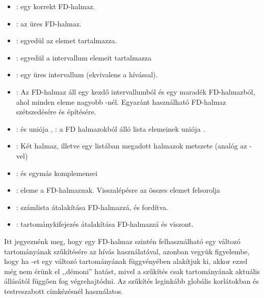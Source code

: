 \begin{itemize}
\item {}:  egy korrekt FD-halmaz.
\item {}:  az üres FD-halmaz.
\item {}:  egyedül az  elemet tartalmazza.
\item {}:  egyedül a 
intervallum elemeit tartalmazza
\item {}:  egy üres intervallum
(ekvivalens a  hívással).
\item {}: Az  FD-halmaz áll egy
 kezdő intervallumból és egy  maradék FD-halmazból, ahol
 minden eleme nagyobb -nél. Egyaránt használható
FD-halmaz szétszedésére és építésére.
\item {}:  és 
uniója ,
: a  FD halmazokból
álló lista elemeinek uniója .
\item {} : Két halmaz, illetve egy listában
megadott halmazok metszete (analóg az -vel)
\item {}:  és  egymás
komplemensei
\item {}:  eleme a  FD-halmaznak.
Visszalépésre az összes elemet felsorolja
\item {}: számlista
átalakítása FD-halmazzá, és fordítva.
\item {}:
tartománykifejezés átalakítása FD-halmazzá és viszont.
\end{itemize}

Itt jegyeznénk meg, hogy egy FD-halmaz szintén felhasználható egy változó
tartományának szűkítésére az  hívás használatával, azonban
vegyük figyelembe, hogy ha -et egy  változó tartományának
függvényében alakítjuk ki, akkor ezzel még nem érünk el ,,démoni'' hatást,
mivel a szűkítés csak  tartományának aktuális állásától függően
fog végrehajtódni. Az  szűkítés leginkább globális korlátokban
és testreszabott címkézésnél használatos.

